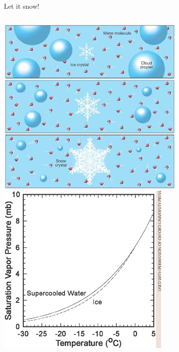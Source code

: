 \documentclass[xcolor=table]{beamer}
\begin{document}
\begin{frame}{Let it snow!}
\begin{columns}[b]
	\vspace{1em}\includegraphics[width=\textwidth]{presentation/bergeron.jpg}
	\includegraphics[width=\textwidth,clip=true,trim=0 0 0.8mm 0]{presentation/queries-figure-1.jpg}
	

\end{columns}
\end{frame}
\end{document}
